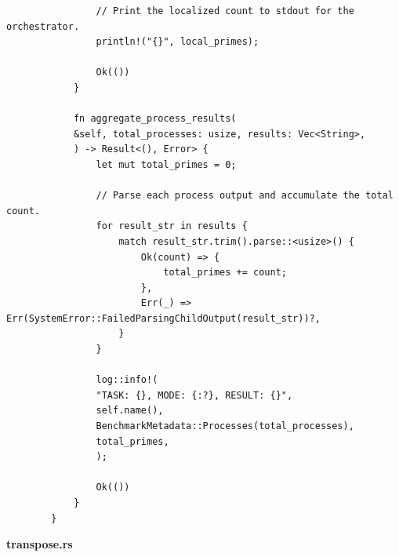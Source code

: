 \documentclass[14pt, a4paper]{extreport}
\begin{document}
\begin{verbatim}
				// Print the localized count to stdout for the orchestrator.
				println!("{}", local_primes);
				
				Ok(())
			}
			
			fn aggregate_process_results(
			&self, total_processes: usize, results: Vec<String>,
			) -> Result<(), Error> {
				let mut total_primes = 0;
				
				// Parse each process output and accumulate the total count.
				for result_str in results {
					match result_str.trim().parse::<usize>() {
						Ok(count) => {
							total_primes += count;
						},
						Err(_) => Err(SystemError::FailedParsingChildOutput(result_str))?,
					}
				}
				
				log::info!(
				"TASK: {}, MODE: {:?}, RESULT: {}",
				self.name(),
				BenchmarkMetadata::Processes(total_processes),
				total_primes,
				);
				
				Ok(())
			}
		}
	\end{verbatim}
	
	\textbf{transpose.rs}
	
\end{document}
